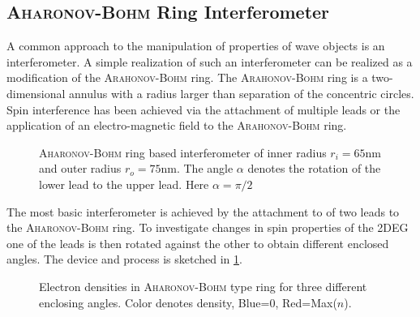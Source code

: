 \subsection{\textsc{Aharonov-Bohm} Ring Interferometer}
A common approach to the manipulation of properties of wave objects is an interferometer. A simple realization of such an interferometer can be realized as a modification of the \textsc{Arahonov-Bohm} ring. The \textsc{Arahonov-Bohm} ring is a two-dimensional annulus with a radius larger than separation of the concentric circles. Spin interference has been achieved via the attachment of multiple leads \cite{PhysRevB.75.035304} or the application of an electro-magnetic field \cite{PhysRevB.69.155335} to the \textsc{Arahonov-Bohm} ring.\par
\begin{figure}[!h]
\centering
{}
\caption{\textsc{Aharonov-Bohm} ring based interferometer of inner radius $r_i=65$nm and outer radius $r_o=75$nm. The angle $\alpha$ denotes the rotation of the lower lead to the upper lead. Here $\alpha=\pi/2$}\label{fig:aharonovbohmring}
\end{figure}
The most basic interferometer is achieved by the attachment to of two leads to the \textsc{Aharonov-Bohm} ring. To investigate changes in spin properties of the 2DEG one of the leads is then rotated against the other to obtain different enclosed angles. The device and process is sketched in \cref{fig:aharonovbohmring}.
\begin{figure}[h!]
\caption{Electron densities in \textsc{Aharonov-Bohm} type ring for three different enclosing angles. Color denotes density, Blue=0, Red=Max($n$).} 
\end{figure}
